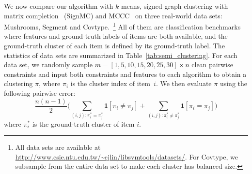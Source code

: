 \documentclass[twoside,11pt]{article}
\newcommand\ind[1]{\mathbf{1}\left[ #1 \right]} %
\begin{document}
We now compare our algorithm with $k$-means,
signed graph clustering with matrix completion~\citep{Chiang14a} (SignMC) and MCCC~\citep{Yi13a}
on three real-world data sets: Mushrooms, Segment
and Covtype.~\footnote{All data sets are available at
\url{http://www.csie.ntu.edu.tw/~cjlin/libsvmtools/datasets/}.  For Covtype, we subsample from
the entire data set to make each cluster has balanced size.}  %
All of them are classification benchmarks where features and ground-truth labels of items are both available,
and the ground-truth cluster of each item is defined by its ground-truth label.
The statistics of data sets are summarized in Table~\ref{tab:semi_clustering}.
For each data set, we randomly sample $m = [1, 5, 10, 15, 20, 25, 30] \times n$ clean pairwise constraints
and input both constraints and features to each algorithm to obtain a clustering $\pi$,
where $\pi_i$ is the cluster index of item~$i$.
We then evaluate $\pi$ using the following pairwise error:
\begin{equation*}
  \frac{n(n-1)}{2} \bigg(\sum_{(i,j):\pi^*_i = \pi^*_j} \ind {\pi_i \neq \pi_j} + \sum_{(i,j):\pi^*_i \neq \pi^*_j} \ind {\pi_i = \pi_j}\bigg)
\end{equation*}
where $\pi^*_i$ is the ground-truth cluster of item $i$.
\end{document}
